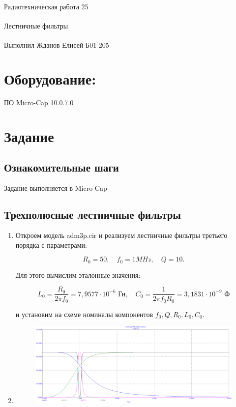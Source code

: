 \documentclass{astroedu-lab}
\begin{document}
\pagestyle{plain}

\begin{problem}{\huge Радиотехническая работа 25\\\\Лестничные фильтры\\\\Выполнил Жданов Елисей Б01-205}

\section{Оборудование:}

ПО Micro-Cap 10.0.7.0

\section{Задание}

\subsection{Ознакомительные шаги}

Задание выполняется в Micro-Cap

\subsection{Трехполюсные лестничные фильтры}

\begin{enumerate}

\item Откроем модель adm3p.cir и реализуем лестничные фильтры третьего порядка с параметрами:

\[R_0 = 50, \quad f_0 = 1MHz, \quad Q = 10.\]

Для этого вычислим эталонные значения:

\[L_0 = \frac{R_0}{2\pi f_0} = 7,9577\cdot 10^{-6} \text{ Гн} , \quad C_0 = \frac{1}{2 \pi f_0 R_0} = 3,1831\cdot 10^{-9} \text{ Ф}\]

и установим на схеме номиналы компонентов $f_0, Q, R_0, L_0, C_0$.

\newpage

\item

\begin{figure}[!h]
	\centering
	\includegraphics[width=1\textwidth]{част2.2.png}
	\label{fig:boiler}
\end{figure}


\end{enumerate}
\end{problem}
\end{document}
